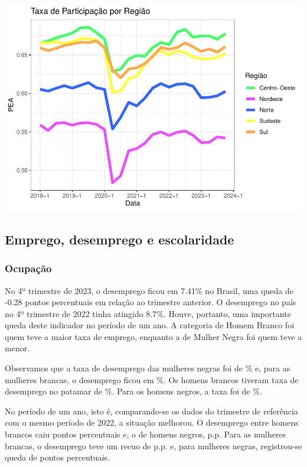 \documentclass[
]{article}
\begin{document}
\includegraphics{R-Markdown--Long-Version-_files/figure-latex/unnamed-chunk-7-1.pdf}

\hypertarget{emprego-desemprego-e-escolaridade}{%
\subsection{Emprego, desemprego e
escolaridade}\label{emprego-desemprego-e-escolaridade}}

\hypertarget{ocupauxe7uxe3o}{%
\subsubsection{Ocupação}\label{ocupauxe7uxe3o}}

No 4º trimestre de 2023, o desemprego ficou em 7.41\% no Brasil, uma
queda de -0.28 pontos percentuais em relação ao trimestre anterior. O
desemprego no país no 4º trimestre de 2022 tinha atingido 8.7\%. Houve,
portanto, uma importante queda deste indicador no período de um ano. A
categoria de Homem Branco foi quem teve a maior taxa de emprego,
enquanto a de Mulher Negra foi quem teve a menor.

Observamos que a taxa de desemprego das mulheres negras foi de \% e,
para as mulheres brancas, o desemprego ficou em \%. Os homens brancos
tiveram taxa de desemprego no patamar de \%. Para os homens negros, a
taxa foi de \%.

No período de um ano, isto é, comparando-se os dados do trimestre de
referência com o mesmo período de 2022, a situação melhorou. O
desemprego entre homens brancos caiu pontos percentuais e, o de homens
negros, p.p. Para as mulheres brancas, o desemprego teve um recuo de
p.p. e, para mulheres negras, registrou-se queda de pontos percentuais.
\end{document}
